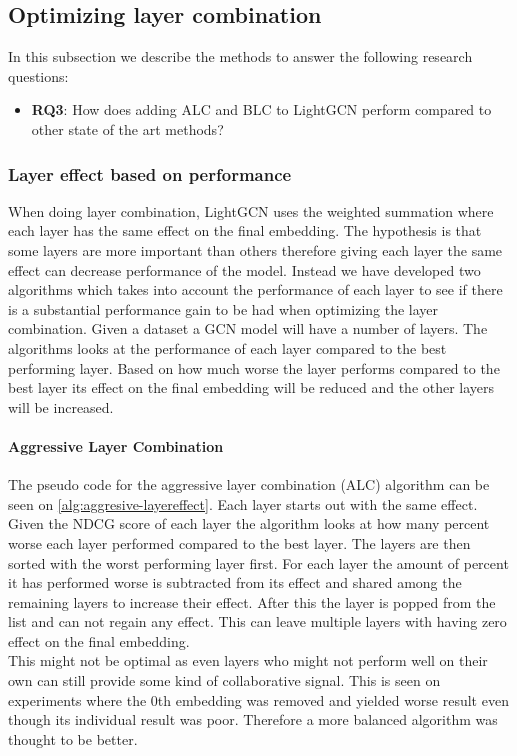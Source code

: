 \subsection{Optimizing layer combination}

In this subsection we describe the methods to answer the following research questions:
\begin{itemize}
    \item \textbf{RQ3}: How does adding ALC and BLC to LightGCN perform compared to other state of the art methods?
\end{itemize}  

\subsubsection{Layer effect based on performance} \label{fredsplit}
When doing layer combination, LightGCN uses the weighted summation where each layer has the same effect on the final embedding.
The hypothesis is that some layers are more important than others therefore giving each layer the same effect can decrease performance of the model.
Instead we have developed two algorithms which takes into account the performance of each layer to see if there is a substantial performance gain to be had when optimizing the layer combination.
Given a dataset a GCN model will have a number of layers.
The algorithms looks at the performance of each layer compared to the best performing layer.
Based on how much worse the layer performs compared to the best layer its effect on the final embedding will be reduced and the other layers will be increased.

\paragraph{Aggressive Layer Combination}
The pseudo code for the aggressive layer combination (ALC) algorithm can be seen on \autoref{alg:aggresive-layereffect}.
Each layer starts out with the same effect.
Given the NDCG score of each layer the algorithm looks at how many percent worse each layer performed compared to the best layer.
The layers are then sorted with the worst performing layer first.
For each layer the amount of percent it has performed worse is subtracted from its effect and shared among the remaining layers to increase their effect.
After this the layer is popped from the list and can not regain any effect.
This can leave multiple layers with having zero effect on the final embedding.
\\
This might not be optimal as even layers who might not perform well on their own can still provide some kind of collaborative signal.
This is seen on experiments where the 0th embedding was removed and yielded worse result even though its individual result was poor.
Therefore a more balanced algorithm was thought to be better.

